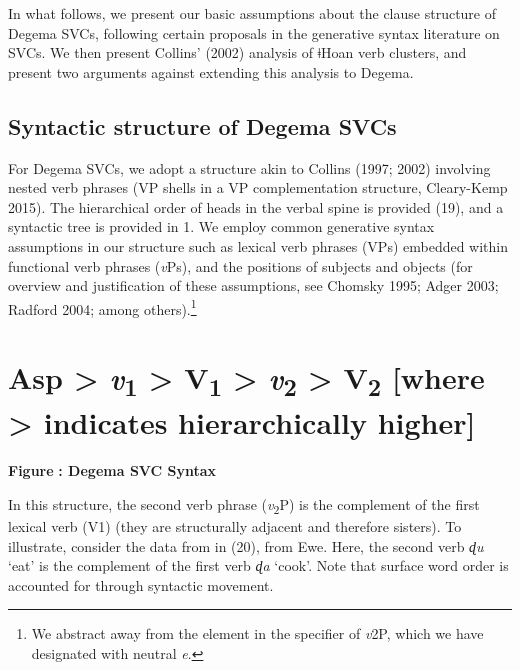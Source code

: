 \documentclass[output=paper]{langsci/langscibook}
\begin{document}
In what follows, we present our basic assumptions about the clause structure of Degema SVCs, following certain proposals in the generative syntax literature on SVCs. We then present Collins’ (2002) analysis of ǂHoan verb clusters, and present two arguments against extending this analysis to Degema. 

\section{Syntactic structure of Degema SVCs}
\label{bkm:Ref449512725}
For Degema SVCs, we adopt a structure akin to Collins (1997; 2002) involving nested verb phrases (VP shells in a VP complementation structure, Cleary-Kemp 2015). The hierarchical order of heads in the verbal spine is provided (19), and a syntactic tree is provided in 1. We employ common generative syntax assumptions in our structure such as lexical verb phrases (VPs) embedded within functional verb phrases (\textit{v}Ps), and the positions of subjects and objects (for overview and justification of these assumptions, see Chomsky 1995; Adger 2003; Radford 2004; among others).\footnote{We abstract away from the element in the specifier of \textit{v}2P, which we have designated with neutral \textit{e}.
}

\chapter[Asp {\textgreater} v1 {\textgreater} V1 {\textgreater} v2 {\textgreater} V2   [where {\textgreater} indicates hierarchically higher{]}]{Asp {\textgreater} \textit{v}\textsubscript{1} {\textgreater} V\textsubscript{1} {\textgreater} \textit{v}\textsubscript{2} {\textgreater} V\textsubscript{2}\textsubscript{   }[where {\textgreater} indicates hierarchically higher]}
\label{bkm:Ref449436541}\begin{styleNoSpacing}
  
 
\end{styleNoSpacing}

\begin{styleNoSpacing}
\label{bkm:Ref449547295}\textbf{Figure }\textbf{: Degema SVC Syntax}
\end{styleNoSpacing}

In this structure, the second verb phrase (\textit{v}\textsubscript{2}P) is the complement of the first lexical verb (V1) (they are structurally adjacent and therefore sisters). To illustrate, consider the data from \citet{Collins1997} in (20), from Ewe. Here, the second verb \textit{ɖu }‘eat’ is the complement of the first verb\textit{ ɖa }‘cook’. Note that surface word order is accounted for through syntactic movement.
\end{document}
